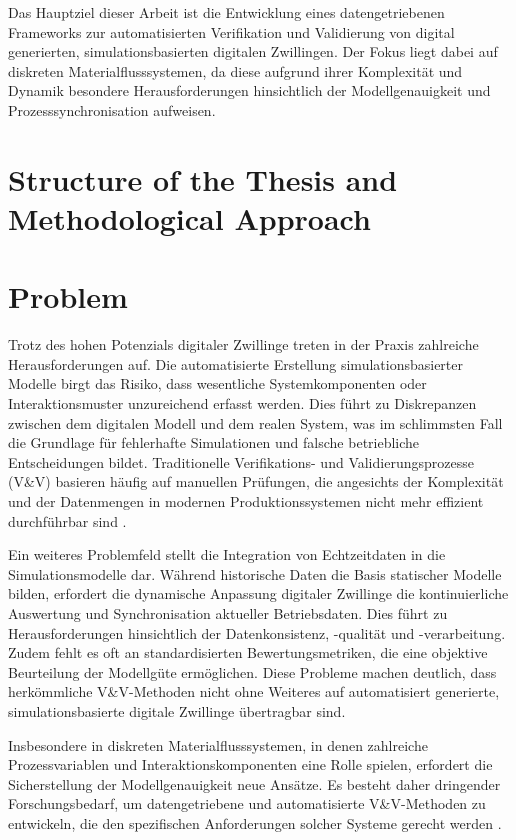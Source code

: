 
Das Hauptziel dieser Arbeit ist die Entwicklung eines datengetriebenen Frameworks zur automatisierten Verifikation und Validierung von digital generierten, simulationsbasierten digitalen Zwillingen. Der Fokus liegt dabei auf diskreten Materialflusssystemen, da diese aufgrund ihrer Komplexität und Dynamik besondere Herausforderungen hinsichtlich der Modellgenauigkeit und Prozesssynchronisation aufweisen.
\section{Structure of the Thesis and Methodological Approach}


\section{Problem}

Trotz des hohen Potenzials digitaler Zwillinge treten in der Praxis zahlreiche Herausforderungen auf. Die automatisierte Erstellung simulationsbasierter Modelle birgt das Risiko, dass wesentliche Systemkomponenten oder Interaktionsmuster unzureichend erfasst werden. Dies führt zu Diskrepanzen zwischen dem digitalen Modell und dem realen System, was im schlimmsten Fall die Grundlage für fehlerhafte Simulationen und falsche betriebliche Entscheidungen bildet. Traditionelle Verifikations- und Validierungsprozesse (V\&V) basieren häufig auf manuellen Prüfungen, die angesichts der Komplexität und der Datenmengen in modernen Produktionssystemen nicht mehr effizient durchführbar sind \parencite{Kritzinger2018}.

Ein weiteres Problemfeld stellt die Integration von Echtzeitdaten in die Simulationsmodelle dar. Während historische Daten die Basis statischer Modelle bilden, erfordert die dynamische Anpassung digitaler Zwillinge die kontinuierliche Auswertung und Synchronisation aktueller Betriebsdaten. Dies führt zu Herausforderungen hinsichtlich der Datenkonsistenz, -qualität und -verarbeitung. Zudem fehlt es oft an standardisierten Bewertungsmetriken, die eine objektive Beurteilung der Modellgüte ermöglichen. Diese Probleme machen deutlich, dass herkömmliche V\&V-Methoden nicht ohne Weiteres auf automatisiert generierte, simulationsbasierte digitale Zwillinge übertragbar sind.

Insbesondere in diskreten Materialflusssystemen, in denen zahlreiche Prozessvariablen und Interaktionskomponenten eine Rolle spielen, erfordert die Sicherstellung der Modellgenauigkeit neue Ansätze. Es besteht daher dringender Forschungsbedarf, um datengetriebene und automatisierte V\&V-Methoden zu entwickeln, die den spezifischen Anforderungen solcher Systeme gerecht werden \parencite{Kritzinger2018, Uhlemann2017}.

